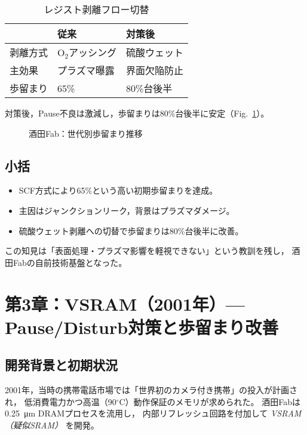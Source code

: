 \documentclass[conference]{IEEEtran}
\let\meter\metre
\begin{document}
\begin{table}[h]
  \centering
  \caption{レジスト剥離フロー切替}
  \label{tab:resist}
  \begin{tabular}{lll}
    \toprule
    & 従来 & 対策後 \\
    \midrule
    剥離方式 & O$_2$アッシング & 硫酸ウェット \\
    主効果 & プラズマ曝露 & 界面欠陥防止 \\
    歩留まり & 65\% & 80\%台後半 \\
    \bottomrule
  \end{tabular}
\end{table}

対策後，Pause不良は激減し，歩留まりは80\%台後半に安定（Fig.~\ref{fig:yield25}）。

\begin{figure}[t]
\centering
{}
\caption{酒田Fab：世代別歩留まり推移}
\label{fig:yield25}
\end{figure}

\subsection{小括}
\begin{itemize}
  \item SCF方式により65\%という高い初期歩留まりを達成。
  \item 主因はジャンクションリーク，背景はプラズマダメージ。
  \item 硫酸ウェット剥離への切替で歩留まりは80\%台後半に改善。
\end{itemize}
この知見は「表面処理・プラズマ影響を軽視できない」という教訓を残し，
酒田Fabの自前技術基盤となった。

\section{第3章：VSRAM（2001年）— Pause/Disturb対策と歩留まり改善}

\subsection{開発背景と初期状況}
2001年，当時の携帯電話市場では「世界初のカメラ付き携帯」の投入が計画され，
低消費電力かつ高温（90$^\circ$C）動作保証のメモリが求められた。
酒田Fabは \SI{0.25}{\micro\meter} DRAMプロセスを流用し，
内部リフレッシュ回路を付加して \emph{VSRAM（疑似SRAM）} を開発。
\end{document}
